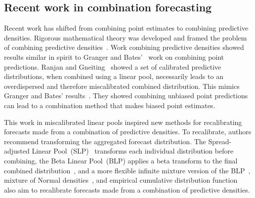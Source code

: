 \documentclass[preprint,authoryear,nonatbib]{elsarticle}
\begin{document}
\subsection{Recent work in combination forecasting}

Recent work has shifted from combining point estimates to combining predictive densities.
Rigorous mathematical theory was developed and framed the problem of combining predictive densities~\parencite{gneiting2013combining}.
Work combining predictive densities showed results similar in spirit to Granger and Bates'~\parencite{bates1969combination,granger1984improved} work on combining point predictions.
Ranjan and Gneiting~\parencite{ranjan2010combining,gneiting2013combining} showed a set of calibrated predictive distributions, when combined using a linear pool, necessarily leads to an overdispersed and therefore miscalibrated combined distribution.
This mimics Granger and Bates' results~\parencite{bates1969combination}. 
They showed combining unbiased point predictions can lead to a combination method that makes biased point estimates.

This work in miscalibrated linear pools inspired new methods for recalibrating forecasts made from a combination of predictive densities. To recalibrate, authors recommend transforming the aggregated forecast distribution.
The Spread-adjusted Linear Pool~(SLP)~\parencite{berrocal2007combining,glahn2009mos,kleiber2011locally} transforms each individual distribution before combining, the Beta Linear Pool~(BLP) applies a beta transform to the final combined  distribution~\parencite{gneiting2013combining,ranjan2010combining}, and a more flexible infinite mixture version of the BLP~\parencite{bassetti2018bayesian}, mixture of Normal densities~\parencite{baran2018combining}, and empirical cumulative distribution function~\parencite{garratt2019empirically} also aim to recalibrate forecasts made from a combination of predictive densities.
\end{document}
